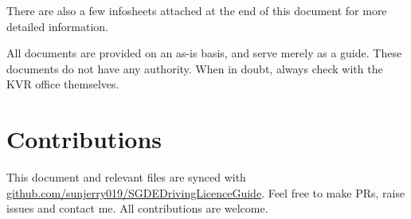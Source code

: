 \documentclass{article}
\begin{document}
    There are also a few infosheets attached at the end of this document for more detailed information. 
    
    All documents are provided on an as-is basis, and serve merely as a guide. These documents do not have any authority. When in doubt, always check with the KVR office themselves.
    
\section{Contributions}
    This document and relevant files are synced with \href{https://github.com/sunjerry019/SGDEDrivingLicenceGuide}{github.com/sunjerry019/SGDEDrivingLicenceGuide}. Feel free to make PRs, raise issues and contact me. All contributions are welcome.

    \vfill

\pagebreak 



\end{document}
